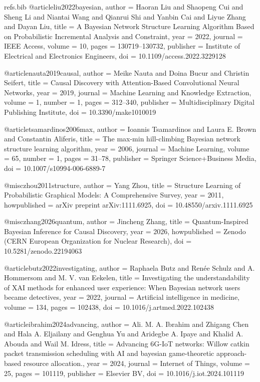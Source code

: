 \begin{filecontents*}[overwrite]{refs.bib}
@article{liu2022bayesian,
  author = {Haoran Liu and Shaopeng Cui and Sheng Li and Niantai Wang and Qianrui Shi and Yanbin Cai and Liyue Zhang and Dayan Liu},
  title = {{A Bayesian Network Structure Learning Algorithm Based on Probabilistic Incremental Analysis and Constraint}},
  year = {2022},
  journal = {IEEE Access},
  volume = {10},
  pages = {130719--130732},
  publisher = {Institute of Electrical and Electronics Engineers},
  doi = {10.1109/access.2022.3229128}
}

@article{nauta2019causal,
  author = {Meike Nauta and Doina Bucur and Christin Seifert},
  title = {{Causal Discovery with Attention-Based Convolutional Neural Networks}},
  year = {2019},
  journal = {Machine Learning and Knowledge Extraction},
  volume = {1},
  number = {1},
  pages = {312--340},
  publisher = {Multidisciplinary Digital Publishing Institute},
  doi = {10.3390/make1010019}
}

@article{tsamardinos2006max,
  author = {Ioannis Tsamardinos and Laura E. Brown and Constantin Aliferis},
  title = {{The max-min hill-climbing Bayesian network structure learning algorithm}},
  year = {2006},
  journal = {Machine Learning},
  volume = {65},
  number = {1},
  pages = {31--78},
  publisher = {Springer Science+Business Media},
  doi = {10.1007/s10994-006-6889-7}
}

@misc{zhou2011structure,
  author = {Yang Zhou},
  title = {{Structure Learning of Probabilistic Graphical Models: A Comprehensive Survey}},
  year = {2011},
  howpublished = {arXiv preprint arXiv:1111.6925},
  doi = {10.48550/arxiv.1111.6925}
}

@misc{zhang2026quantum,
  author = {Jincheng Zhang},
  title = {{Quantum-Inspired Bayesian Inference for Causal Discovery}},
  year = {2026},
  howpublished = {Zenodo (CERN European Organization for Nuclear Research)},
  doi = {10.5281/zenodo.22194063}
}

@article{butz2022investigating,
  author = {Raphaela Butz and Ren{\'e}e Schulz and A. Hommersom and M. V. van Eekelen},
  title = {{Investigating the understandability of XAI methods for enhanced user experience: When Bayesian network users became detectives}},
  year = {2022},
  journal = {Artificial intelligence in medicine},
  volume = {134},
  pages = {102438},
  doi = {10.1016/j.artmed.2022.102438}
}

@article{ibrahim2024advancing,
  author = {Ali. M. A. Ibrahim and Zhigang Chen and Hala A. Eljailany and Genghua Yu and Aridegbe A. Ipaye and Khalid A. Abouda and Wail M. Idress},
  title = {{Advancing 6G-IoT networks: Willow catkin packet transmission scheduling with AI and bayesian game-theoretic approach-based resource allocation.}},
  year = {2024},
  journal = {Internet of Things},
  volume = {25},
  pages = {101119},
  publisher = {Elsevier BV},
  doi = {10.1016/j.iot.2024.101119}
}


\end{filecontents*}
